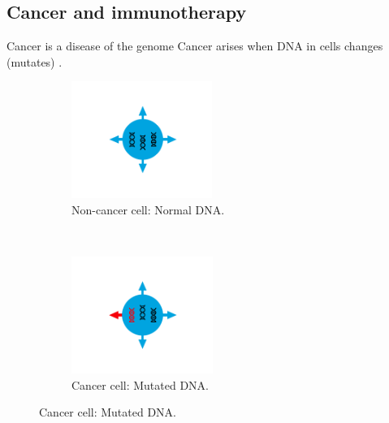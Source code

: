 \documentclass{beamer}
\begin{document}
\subsection{Cancer and immunotherapy}
\begin{frame}{Cancer is a disease of the genome}
Cancer arises when DNA in cells changes (mutates) \citep{hanahan_hallmarks_2011}.
\begin{figure}[t!]
    \centering
    \begin{subfigure}[t]{0.45\textwidth}
        \centering
        \includegraphics[height=1.5in]{../results/figures/IC1.png}
        \caption{Non-cancer cell: Normal DNA.}
    \end{subfigure}
    ~ 
    \begin{subfigure}[t]{0.45\textwidth}
        \centering
        \includegraphics[height=1.5in]{../results/figures/IC2.png}
        \caption{Cancer cell: Mutated DNA.}
    \end{subfigure}
\end{figure}
\end{frame}
\end{document}
